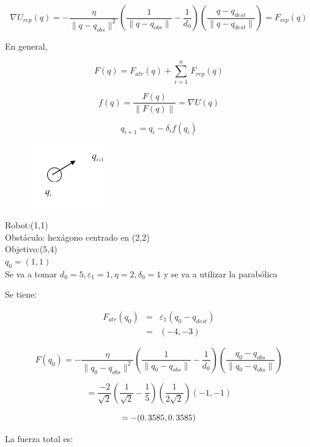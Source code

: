 $$
\nabla U_{rep}(q)=-\dfrac{\eta}{\rVert q-q_{obs}\lVert ^2} \left( \dfrac{1}{\lVert q-q_{obs}\rVert} - \dfrac{1}{d_0} \right)
\left( \dfrac{q-q_{dest}}{\lVert q-q_{dest}\rVert}\right)
 =F_{rep}(q)
$$

En general,

$$
F(q)=F_{atr}(q)+\sum_{i=1}^{n}\, F_{rep}(q)
$$

$$
f(q)=\frac{F(q)}{\|F(q)\|}=\nabla U(q)
$$

$$
q_{i+1}=q_i - \delta_i f(q_i)
$$

\begin{figure}[h!]
	\centering
	\includegraphics[width=0.3\textwidth]{images/img59.png}
	\label{figura59}
\end{figure}



\begin{ejemplo}
	Robot:(1,1) \\
	Obstáculo: hexágono centrado en (2,2) \\
	Objetivo:(5,4) \\
	$q_0=(1,1)$\\
	Se va a tomar $d_0=	5, \varepsilon_1=1, \eta=2,\delta_0=1$ y se va a utilizar la parabólica
\end{ejemplo}

Se tiene: 

$$
\begin{array}{rcl}
F_{atr}(q_0) & = & \varepsilon_1 (q_0-q_{dest}) \\
             & = &  (-4,-3)
             
             
\end{array}
$$

$$
F(q_0) = - \dfrac{\eta}{\rVert q_0 - q_{obs} \lVert^2} \left(\dfrac{1}{\lVert q_0-q_{obs}\rVert} - \dfrac{1}{d_0} \right)
\left( \dfrac{q_0 - q_{obs}}{\lVert q_0 - q_{obs}\rVert}\right)
$$

$$
= \dfrac {-2}{\sqrt{2}} 
\left(\dfrac{1}{\sqrt{2}} - \dfrac{1}{5}\right) \left(\dfrac{1}{2\sqrt{2}} \right) (-1,-1)
$$


$$=-(0\ldotp3585,0\ldotp3585)$$

La fuerza total es: 



